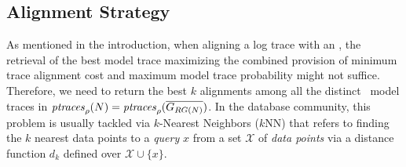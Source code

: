 
\subsection{Alignment Strategy}\label{subsec:as}
As mentioned in the introduction, when aligning a log trace with an \uswn, the retrieval of the best model trace maximizing the combined provision of minimum trace alignment cost and maximum model trace probability might not suffice.
Therefore, we need to return the best $k$ alignments among all the distinct \unravelled\ model traces in $\mathit{ptraces}_{\rho}(N)=\mathit{ptraces}_{\rho}(\overline{G_{RG(N)}})$. In the database community, this problem is usually tackled via $k$-Nearest Neighbors ($k$NN) that refers to finding the $k$ nearest data points to a \textit{query} $x$ from a set $\mathcal{X}$ of \textit{data points} via a distance function $d_k$ defined over $\mathcal{X}\cup\{x\}$.


